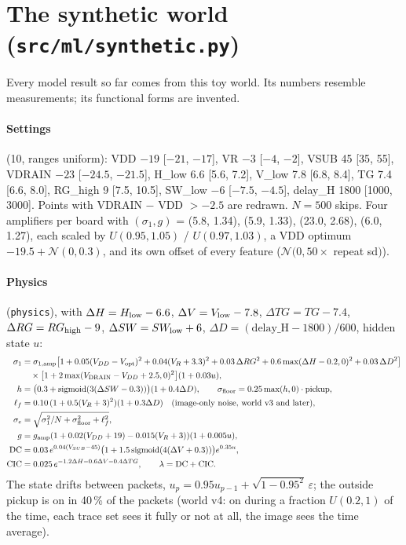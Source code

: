 \documentclass[10pt]{article}
\newcommand{\code}[1]{\texttt{#1}}
\newcommand{\se}{\sigma_e}
\begin{document}
\section{The synthetic world (\code{src/ml/synthetic.py})}
\label{sec:synthetic}

Every model result so far comes from this toy world. Its numbers resemble measurements; its functional forms are
invented.

\paragraph{Settings} (10, ranges uniform): VDD $-19$ [$-21$, $-17$], VR $-3$ [$-4$, $-2$], VSUB 45 [35, 55],
VDRAIN $-23$ [$-24.5$, $-21.5$], H\_low 6.6 [5.6, 7.2], V\_low 7.8 [6.8, 8.4], TG 7.4 [6.6, 8.0], RG\_high 9 [7.5, 10.5],
SW\_low $-6$ [$-7.5$, $-4.5$], delay\_H 1800 [1000, 3000]. Points with VDRAIN $-$ VDD $> -2.5$ are redrawn. $N = 500$
skips. Four amplifiers per board with $(\sigma_1, g)$ = (5.8, 1.34), (5.9, 1.33), (23.0, 2.68), (6.0, 1.27), each scaled
by $U(0.95, 1.05)$ / $U(0.97, 1.03)$, a VDD optimum $-19.5 + \mathcal N(0, 0.3)$, and its own offset of every feature
($\mathcal N(0, 50\times$ repeat sd$)$).

\paragraph{Physics} (\code{physics}), with $\Delta H = H_{\rm low} - 6.6$, $\Delta V = V_{\rm low} - 7.8$,
$\Delta TG = TG - 7.4$, $\Delta RG = RG_{\rm high} - 9$, $\Delta SW = SW_{\rm low} + 6$, $\Delta D = (\mathrm{delay\_H} -
1800)/600$, hidden state $u$:
\begin{align*}
\sigma_1 &= \sigma_{1,{\rm amp}}\big[1 + 0.05(V_{DD} - V_{\rm opt})^2 + 0.04(V_R + 3.3)^2 + 0.03\,\Delta RG^2 + 0.6\max(\Delta H - 0.2, 0)^2 + 0.03\,\Delta D^2\big]\\
&\quad\times\big[1 + 2\max(V_{\rm DRAIN} - V_{DD} + 2.5, 0)^2\big](1 + 0.03u),\\
h &= \big(0.3 + \mathrm{sigmoid}(3(\Delta SW - 0.3))\big)(1 + 0.4\Delta D),\qquad \sigma_{\rm floor} = 0.25\max(h, 0)\cdot\text{pickup},\\
\ell_f &= 0.10\,(1 + 0.5(V_R + 3)^2)(1 + 0.3\Delta D)\quad\text{(image-only noise, world v3 and later)},\\
\se &= \sqrt{\sigma_1^2/N + \sigma_{\rm floor}^2 + \ell_f^2},\\
g &= g_{\rm amp}(1 + 0.02(V_{DD} + 19) - 0.015(V_R + 3))(1 + 0.005u),\\
\mathrm{DC} &= 0.03\,e^{0.04(V_{SUB} - 45)}\big(1 + 1.5\,\mathrm{sigmoid}(4(\Delta V + 0.3))\big)e^{0.35u},\\
\mathrm{CIC} &= 0.025\,e^{-1.2\Delta H - 0.6\Delta V - 0.4\Delta TG},\qquad \lambda = \mathrm{DC} + \mathrm{CIC}.
\end{align*}
The state drifts between packets, $u_{p} = 0.95u_{p-1} + \sqrt{1 - 0.95^2}\,\varepsilon$; the outside pickup is on in
40\,\% of the packets (world v4: on during a fraction $U(0.2, 1)$ of the time, each trace set sees it fully or not at
all, the image sees the time average).
\end{document}
